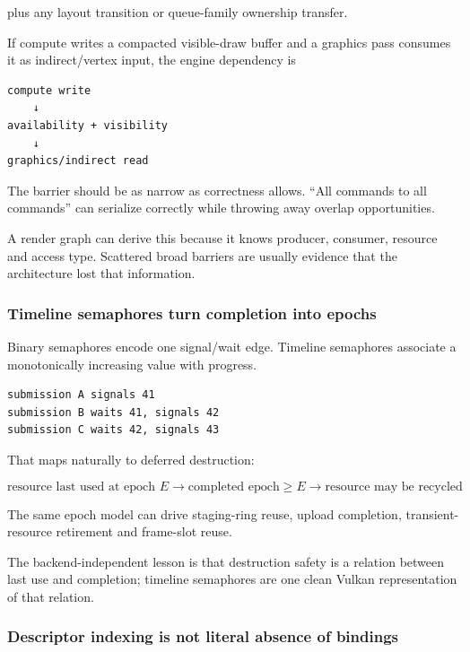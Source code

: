 plus any layout transition or queue-family ownership transfer.

If compute writes a compacted visible-draw buffer and a graphics pass consumes it as indirect/vertex input, the engine dependency is

\begin{verbatim}
compute write
    ↓
availability + visibility
    ↓
graphics/indirect read
\end{verbatim}

The barrier should be as narrow as correctness allows. ``All commands to all commands'' can serialize correctly while throwing away overlap opportunities.

A render graph can derive this because it knows producer, consumer, resource and access type. Scattered broad barriers are usually evidence that the architecture lost that information.

\subsubsection{Timeline semaphores turn completion into epochs}\label{05-engine-i-ch023-timeline-semaphores-turn-completion-into-epochs}

Binary semaphores encode one signal/wait edge. Timeline semaphores associate a monotonically increasing value with progress.

\begin{verbatim}
submission A signals 41
submission B waits 41, signals 42
submission C waits 42, signals 43
\end{verbatim}

That maps naturally to deferred destruction:

\[
\boxed{
\text{resource last used at epoch }E
\rightarrow
\text{completed epoch}\ge E
\rightarrow
\text{resource may be recycled}
}
\]

The same epoch model can drive staging-ring reuse, upload completion, transient-resource retirement and frame-slot reuse.

The backend-independent lesson is that destruction safety is a relation between last use and completion; timeline semaphores are one clean Vulkan representation of that relation.

\subsubsection{Descriptor indexing is not literal absence of bindings}\label{05-engine-i-ch023-descriptor-indexing-is-not-literal-absence-of-bindings}

